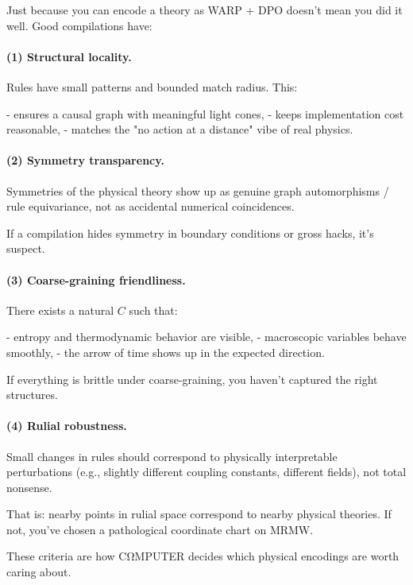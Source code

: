 Just because you can encode a theory as WARP + DPO doesn’t mean you did it well.
Good compilations have:

\paragraph{(1) Structural locality.}

Rules have small patterns and bounded match radius. This:

- ensures a causal graph with meaningful light cones,
- keeps implementation cost reasonable,
- matches the "no action at a distance" vibe of real physics.

\paragraph{(2) Symmetry transparency.}

Symmetries of the physical theory show up as genuine graph automorphisms / rule
equivariance, not as accidental numerical coincidences.

If a compilation hides symmetry in boundary conditions or gross hacks, it’s suspect.

\paragraph{(3) Coarse-graining friendliness.}

There exists a natural $C$ such that:

- entropy and thermodynamic behavior are visible,
- macroscopic variables behave smoothly,
- the arrow of time shows up in the expected direction.

If everything is brittle under coarse-graining, you haven’t captured the right structures.

\paragraph{(4) Rulial robustness.}

Small changes in rules should correspond to physically interpretable perturbations
(e.g., slightly different coupling constants, different fields), not total nonsense.

That is: nearby points in rulial space correspond to nearby physical theories.
If not, you’ve chosen a pathological coordinate chart on MRMW.

These criteria are how CΩMPUTER decides which physical encodings are worth caring about.

